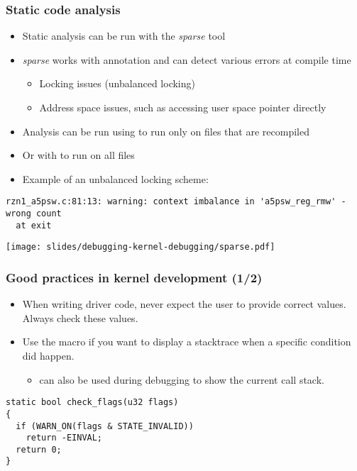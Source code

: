 

\begin{frame}[fragile]
  \frametitle{Static code analysis}
  \begin{itemize}
    \item Static analysis can be run with the {\em sparse} tool
    \item {\em sparse} works with annotation and can detect various errors at
          compile time
    \begin{itemize}
      \item Locking issues (unbalanced locking)
      \item Address space issues, such as accessing user space pointer directly
    \end{itemize}
    \item Analysis can be run using  to run only on files that are
          recompiled
    \item Or with  to run on all files
    \item Example of an unbalanced locking scheme:
  \end{itemize}
  \begin{block}{}
    \begin{verbatim}
rzn1_a5psw.c:81:13: warning: context imbalance in 'a5psw_reg_rmw' - wrong count
  at exit
    \end{verbatim}
  \end{block}

  \vspace{0.5cm}
  \begin{center}
    \texttt{[image: slides/debugging-kernel-debugging/sparse.pdf]}
  \end{center}
\end{frame}

\begin{frame}[fragile]
  \frametitle{Good practices in kernel development (1/2)}
  \begin{itemize}
    \item When writing driver code, never expect the user to provide correct
          values. Always check these values.
    \item Use the  macro if you want to display a stacktrace when
      a specific condition did happen.
    \begin{itemize}
      \item {} can also be used during debugging to
        show the current call stack.
    \end{itemize}
  \end{itemize}
  \begin{block}{}
    \begin{verbatim}
static bool check_flags(u32 flags)
{
  if (WARN_ON(flags & STATE_INVALID))
    return -EINVAL;
  return 0;
}
    \end{verbatim}
  \end{block}
\end{frame}

